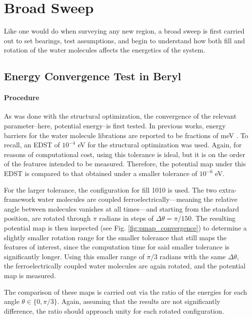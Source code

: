     \section{Broad Sweep}
    Like one would do when surveying any new region, a broad sweep is first carried out to set bearings, test assumptions, and begin to understand how both fill and rotation of the water molecules affects the energetics of the system. 
        \subsection{Energy Convergence Test in Beryl}
        \label{sec:en_conv_test}
        \paragraph{Procedure} As was done with the structural optimization, the convergence of the relevant parameter--here, potential energy--is first tested. In previous works, energy barriers for the water molecule librations are reported to be fractions of meV \cite{vibr_states}. To recall, an EDST of $10^{-4}$ eV for the structural optimization was used. Again, for reasons of computational cost, using this tolerance is ideal, but it is on the order of the features intended to be measured. Therefore, the potential map under this EDST is compared to that obtained under a smaller tolerance of $10^{-6}$ eV. 
        
        For the larger tolerance, the configuration for fill 1010 is used. The two extra-framework water molecules are coupled ferroelectrically---meaning the relative angle between molecules vanishes at all times---and starting from the standard position, are rotated through $\pi$ radians in steps of $\Delta \theta = \pi/150$. The resulting potential map is then inspected (see Fig. \ref{fig:pmap_convergence}) to determine a slightly smaller rotation range for the smaller tolerance that still maps the features of interest, since the computation time for said smaller tolerance is significantly longer. Using this smaller range of $\pi/3$ radians with the same $\Delta \theta$, the ferroelectrically coupled water molecules are again rotated, and the potential map is measured.
        
        The comparison of these maps is carried out via the ratio of the energies for each angle $\theta \in \{0,\pi/3\}$. Again, assuming that the results are not significantly difference, the ratio should approach unity for each rotated configuration.
        
